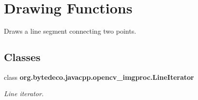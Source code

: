 \hypertarget{group__imgproc__draw}{}\section{Drawing Functions}
\label{group__imgproc__draw}


Draws a line segment connecting two points.  


\subsection*{Classes}
\begin{DoxyCompactItemize}
\item 
class {\bfseries org.\+bytedeco.\+javacpp.\+opencv\+\_\+imgproc.\+Line\+Iterator}
\begin{DoxyCompactList}\small\item\em Line iterator. \end{DoxyCompactList}\end{DoxyCompactItemize}
